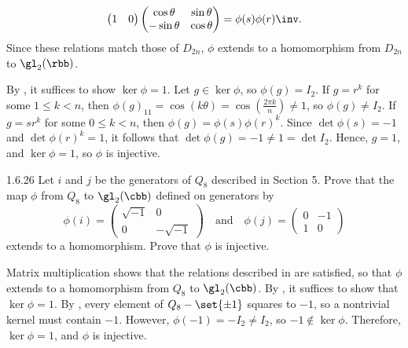 \begin{solenum}
\[\begin{pmatrix}
            1 & 0
        \end{pmatrix}
        \begin{pmatrix}
            \cos\theta & \sin\theta \\
            -\sin\theta & \cos\theta
        \end{pmatrix} = 
        \phi(s)\phi(r)\inv.
    \]
	Since these relations match those of $D_{2n}$, $\phi$ extends to a homomorphism from $D_{2n}$ to $\gl_2(\rbb)$.
    \item By , it suffices to show $\ker\phi = 1$.
    Let $g \in \ker\phi$, so $\phi(g) = I_2$.
    If $g = r^k$ for some $1 \leq k < n$, then $\phi(g)_{11} = \cos(k\theta) = \cos(\frac{2\pi k}{n}) \neq 1$, so $\phi(g) \neq I_2$.
    If $g = sr^k$ for some $0 \leq k < n$, then $\phi(g) = \phi(s)\phi(r)^k$.
    Since $\det\phi(s) = -1$ and $\det\phi(r)^k = 1$, it follows that $\det\phi(g) = - 1 \neq 1 = \det I_2$.
    Hence, $g = 1$, and $\ker\phi = 1$, so $\phi$ is injective.
\end{solenum}

\begin{exercise}{1.6.26}
    Let $i$ and $j$ be the generators of $Q_8$ described in Section 5.
	Prove that the map $\phi$ from $Q_8$ to $\gl_2(\cbb)$ defined on generators by
    \[
        \phi(i) = 
        \begin{pmatrix}
            \sqrt{-1} & 0 \\
            0 & -\sqrt{-1}
        \end{pmatrix}
        \quad \text{and} \quad
        \phi(j) = 
        \begin{pmatrix}
            0 & -1 \\
            1 & 0
        \end{pmatrix}
    \]
    extends to a homomorphism.
	Prove that $\phi$ is injective.
\end{exercise}

\begin{sol}
    Matrix multiplication shows that the relations described in  are satisfied, so that $\phi$ extends to a homomorphism from $Q_8$ to $\gl_2(\cbb)$.
	By , it suffices to show that $\ker\phi = 1$.
    By , every element of $Q_8 - \set{\pm 1}$ squares to $-1$, so a nontrivial kernel must contain $-1$.
    However, $\phi(-1) = -I_2 \neq I_2$, so $-1 \notin \ker\phi$.
    Therefore, $\ker\phi = 1$, and $\phi$ is injective.
\end{sol}